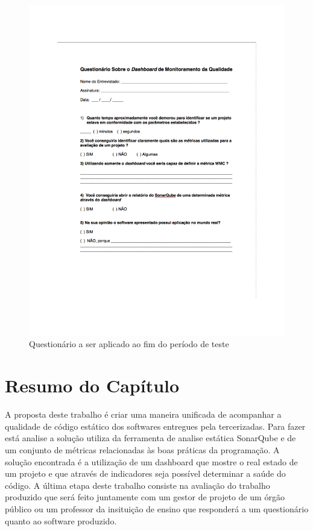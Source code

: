 \graphicspath{{figuras/}}
\begin{figure}[h]
\centering
\includegraphics[scale=1.00]{questionario}
\caption{Questionário a ser aplicado ao fim do período de teste}
\label{img:questionario}
\end{figure}

\section{Resumo do Capítulo}
A proposta deste trabalho é criar uma maneira unificada de acompanhar a qualidade de código estático dos softwares entregues pela tercerizadas. Para fazer está analise a solução utiliza da ferramenta de analise estática SonarQube e de um conjunto de métricas relacionadas às boas práticas da programação. A solução encontrada é a utilização de um dashboard que mostre o real estado de um projeto e que através de indicadores seja possível determinar a saúde do código. A última etapa deste trabalho consiste na avaliação do trabalho produzido que será feito juntamente com um gestor de projeto de um órgão público ou um professor da insituição de ensino que responderá a um questionário quanto ao software produzido.